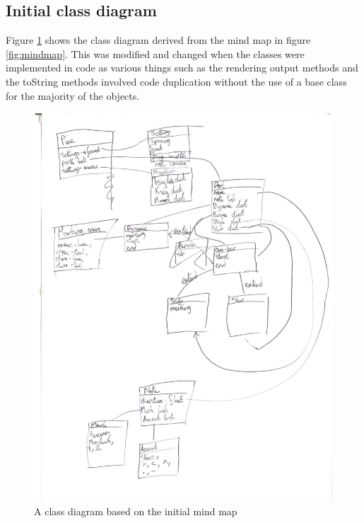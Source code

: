 \begin{appendices}
\section{Initial class diagram}
Figure \ref{fig:handclass} shows the class diagram derived from the mind map in figure \ref{fig:mindmap}. This was modified and changed when the classes were implemented in code as various things such as the rendering output methods and the toString methods involved code duplication without the use of a base class for the majority of the objects.
\begin{figure}[H]
\centering
\includegraphics[width=400pt]{class-diagram}
\caption{A class diagram based on the initial mind map}
\label{fig:handclass}
\end{figure}


\end{appendices}
